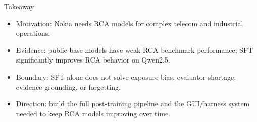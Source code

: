 \begin{frame}{Takeaway}
  \begin{itemize}
    \item Motivation: Nokia needs RCA models for complex telecom and industrial
      operations.
    \item Evidence: public base models have weak RCA benchmark performance; SFT
      significantly improves RCA behavior on Qwen2.5.
    \item Boundary: SFT alone does not solve exposure bias, evaluator shortage,
      evidence grounding, or forgetting.
    \item Direction: build the full post-training pipeline and the GUI/harness
      system needed to keep RCA models improving over time.
  \end{itemize}
\end{frame}
